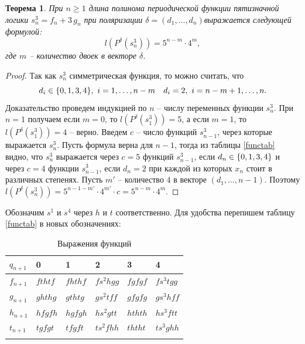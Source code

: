 \documentclass[bibliography=totoc, a4paper, 14pt]{extarticle}
\newtheorem{myth}{Теорема}
\def\in{\mathchar"3232\nobreak\discretionary{}{\usefont{OMS}{cmsy}{m}{n}\char50}{}}
\begin{document}
\begin{myth}
\label{ths3}
При $n \geqslant 1$ длина полинома периодической функции пятизначной логики ${s^3_n = f_n + 3\,g_n}$
при поляризации $\delta = (d_1,\ldots,d_n)$выражается следующей формулой:
$$ l(P^{\delta}(s^3_n)) = 5^{n-m} \cdot 4^m ,$$
где $m$ -- количество двоек в векторе $\delta$.
\end{myth}
\begin{proof}
Так как $s^3_n$ симметрическая функция, то можно считать, что
$$d_i \in \{0,1,3,4\},\ i=1,\dots,n-m \quad d_i = 2,\ i=n-m+1,\dots,n.$$
Доказательство проведем индукцией по $n$ -- числу переменных функции $s^3_n$.
При $n = 1$ получаем если $m=0$, то $l(P^{\delta}(s^3_1)) = 5$, а если $m=1$, то
$l(P^{\delta}(s^3_1))=4$ -- верно. Введем $c$ -- число функций $s^3_{n-1}$, через которые
выражается $s^3_n$. Пусть формула верна для ${n-1}$, тогда из таблицы \ref{functab} видно, что
$s^3_n$ выражается через $c=5$ функций $s^3_{n-1}$, если ${d_n \in \{0,1,3,4\}}$ и через $c=4$
функции $s^3_{n-1}$, если $d_n = 2$ при каждой из которых $x_n$ стоит в различных степенях.
Пусть $m'$ -- количество $4$ в векторе $(d_1,\dots,n-1)$.
Поэтому ${l(P^{\delta}(s^3_n)) = 5^{n-1-m'} \cdot 4^{m'} \cdot c = 5^{n-m}\cdot4^m}$.
\end{proof}



Обозначим $s^1$ и $s^4$ через $h$ и $t$ соответственно.
Для удобства перепишем таблицу \ref{functab} в новых обозначениях:

\begin{center}
\begin{longtable}{| l | l | l | l | l | l |}

\hline $q_{n+1}$ & 0 & 1 & 2 & 3 & 4 \\
\hline

$f_{n+1}$ & $f t h t f$ & $f h t h f$ & $f s^2 h g g$ & $f g f g f$ & $f s^3 t g g$
\\ \hline

$g_{n+1}$ & $g h t h g$ & $g t h t g$ & $g s^2 t f f$ & $g f g f g$ & $g s^3 h f f$
\\ \hline

$h_{n+1}$ & $h f g f h$ & $h g f g h$ & $h s^2 g t t$ & $h t h t h$ & $h s^3 f t t$
\\ \hline

$t_{n+1}$ & $t g f g t$ & $t f g f t$ & $t s^2 f h h$ & $t h t h t$ & $t s^3 g h h$
\\ \hline

\caption{Выражения функций}
\label{functab2}
\end{longtable}
\end{center}
\end{document}

